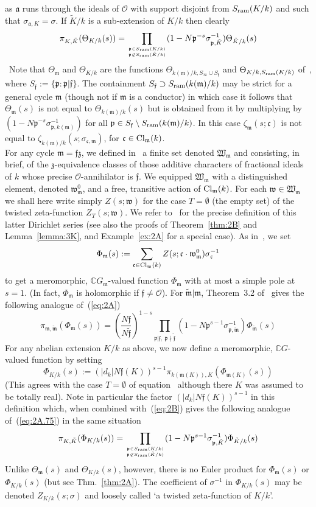 \documentclass[12pt]{article}
\newcounter{rem}[section]%
\newcommand{\bbC}{\ensuremath{\mathbb{C}}}
\newcommand{\beql}[1]{\begin{equation}\label{#1}}
\newcommand{\Cl}{{\rm Cl}}
\newcommand{\cO}{\ensuremath{\mathcal{O}}}
\newcommand{\eeq}{\end{equation}}
\newcommand{\fa}{\ensuremath{\mathfrak{a}}}
\newcommand{\fc}{\ensuremath{\mathfrak{c}}}
\newcommand{\ff}{\ensuremath{\mathfrak{f}}}
\newcommand{\fm}{\ensuremath{\mathfrak{m}}}
\newcommand{\fp}{\ensuremath{\mathfrak{p}}}
\newcommand{\fw}{\ensuremath{\mathfrak{w}}}
\newcommand{\fW}{\ensuremath{\mathfrak{W}}}
\newcommand{\fz}{\ensuremath{\mathfrak{z}}}
\newcommand{\inv}{^{-1}}%
\newcommand{\ndiv}{\nmid}
\newcommand{\nin}{\not\in}
\newcommand{\refeq}[1]{~(\ref{eq:#1})}
\newcommand{\rem}{\refstepcounter{rem}\noindent{\sc Remark \therem}}%
\renewcommand{\therem}{\thesection.\arabic{rem}}
\newcommand{\Clmk}{\ensuremath{\Cl_\fm(k)}}
\newcommand{\PhiKks}{\ensuremath{\Phi_{K/k}(s)}}
\newcommand{\tff}{\ensuremath{\tilde{\ff}}}
\newcommand{\tfm}{\ensuremath{{\tilde{\fm}}}}
\newcommand{\tK}{\ensuremath{\tilde{K}}}
\newcommand{\ThetaKk}{\ensuremath{\Theta_{K/k}}}
\begin{document}
as $\fa$ runs through the ideals of $\cO$ with support disjoint
from $S_{\rm ram}(K/k)$ and such that $\sigma_{\fa,K}=\sigma$. If $\tilde{K}/k$ is
a sub-extension of $K/k$ then clearly
\beql{eq:2A.75}
\pi_{K,\tilde{K}}(\Theta_{K/k}(s))=
\prod_{\fp\in S_{\rm ram}(K/k)\atop \fp\nin S_{\rm ram}(\tilde{K}/k)}
(1-N\fp^{-s}\sigma_{\fp,\tilde{K}}\inv)\Theta_{\tilde{K}/k}(s)
\eeq
\rem\ Note that $\Theta_\fm$ and $\Theta_{K/k}$ are the functions
$\Theta_{k(\fm)/k,S_\infty\cup S_\ff}$ and
$\Theta_{K/k, S_{\rm ram}(K/k)}$ of~\cite[Ch. IV]{Tate}, where
$S_\ff:=\{\fp:\fp|\ff\}$.
The containment $S_\ff\supset S_{\rm ram}(k(\fm)/k)$
may be strict for a general cycle $\fm$ (though not if $\fm$ is a conductor)
in which case it follows that
$\Theta_{\fm}(s)$ is not equal to
$\Theta_{k(\fm)/k}(s)$ but is obtained from it by multiplying by
$(1-N\fp^{-s}\sigma_{\fp,k(\fm)}\inv)$ for all
$\fp\in S_\ff\setminus S_{\rm ram}(k(\fm)/k)$.
In this case $\zeta_\fm(s;\fc)$ is not equal to $\zeta_{k(\fm)/k}(s;\sigma_{\fc,\fm})$,
for $\fc\in \Clmk$.\vspace{2ex}\\
For any cycle $\fm=\ff\fz$, we defined in~\cite{twizas} a finite
set denoted $\fW_\fm$ and consisting, in brief, of the
$\fz$-equivalence classes of those additive characters of
fractional ideals of $k$ whose precise $\cO$-annihilator is $\ff$.
We equipped $\fW_\fm$ with a distinguished element, denoted $\fw_\fm^0$,
and a free, transitive action of $\Clmk$. For each
$\fw\in\fW_\fm$ we shall here write simply $Z(s;\fw)$ for the
case $T=\emptyset$ (the empty set) of the twisted zeta-function
$Z_T(s;\fw)$. We refer to~\cite{twizas} for the precise definition of this latter
Dirichlet series (see also the proofs of Theorem~\ref{thm:2B} and
Lemma~\ref{lemma:3K}, and Example~\ref{ex:2A} for a special case). As in~\cite{twizas}, we set
\beql{eq:2A.9}
\Phi_\fm(s):=\sum_{\fc\in\Clmk}Z(s;\fc\cdot\fw_\fm^0)\sigma_\fc\inv
\eeq
to get a meromorphic, $\bbC G_\fm$-valued function $\Phi_{\fm}$
with at most a simple pole at $s=1$. (In fact, $\Phi_{\fm}$ is holomorphic if $\ff\neq \cO$).
For $\tfm|\fm$,
Theorem~3.2 of~\cite{twizas} gives the following analogue of\refeq{2A}
\beql{eq:2B}
\pi_{\fm,\tfm}(\Phi_{\fm}(s))=\left(\frac{N\ff}{N\tff}\right)^{1-s}
\prod_{\fp|\ff,\ \fp\ndiv\tff}
(1-N\fp^{s-1}\sigma_{\fp,\tfm}\inv)\Phi_{\tfm}(s)
\eeq
For any abelian extension $K/k$ as above,
we now define a meromorphic, $\bbC G$-valued function by setting
\beql{eq:2C}
\Phi_{K/k}(s):=(|d_k|N\ff(K))^{s-1}\pi_{k(\fm(K)),K}(\Phi_{\fm(K)}(s))
\eeq
(This agrees with the case $T=\emptyset$ of equation~\cite[eq.~4]{sconzp}
although there $K$ was assumed to be totally real). Note in particular
the factor $(|d_k|N\ff(K))^{s-1}$ in this definition which,
when combined with\refeq{2B} gives the following analogue of\refeq{2A.75} in the same
situation
\beql{eq:piTheta}
\pi_{K,\tK}(\Phi_{K/k}(s))=
\prod_{\fp\in S_{\rm ram}(K/k)\atop \fp\nin S_{\rm ram}(\tK/k)}
(1-N\fp^{s-1}\sigma_{\fp,\tK}\inv)\Phi_{\tK/k}(s)
\eeq
Unlike $\Theta_{\fm}(s)$ and $\ThetaKk(s)$, however, there is no Euler
product for $\Phi_\fm(s)$ or $\PhiKks$ (but see
Thm.~\ref{thm:2A}).
The coefficient of $\sigma\inv$ in $\PhiKks$ may be denoted
$Z_{K/k}(s;\sigma)$ and loosely called `a twisted zeta-function of $K/k$'.
\end{document}

